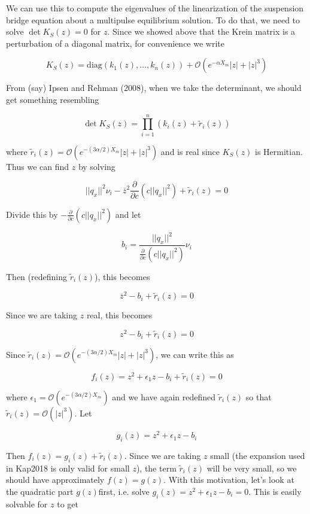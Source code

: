 \documentclass[12pt]{article}
\begin{document}
We can use this to compute the eigenvalues of the linearization of the suspension bridge equation about a multipulse equilibrium solution. To do that, we need to solve $\det K_S(z) = 0$ for $z$. Since we showed above that the Krein matrix is a perturbation of a diagonal matrix, for convenience we write

\[
K_S(z) = \text{diag}(k_1(z), \dots, k_n(z)) + \mathcal{O}(e^{-\alpha X_m}|z| + |z|^3)
\]

From (say) Ipsen and Rehman (2008), when we take the determinant, we should get something resembling

\[
\det K_S(z) = \prod_{i = 1}^n (k_i(z) + \tilde{r}_i(z))
\]

where $\tilde{r}_i(z) = \mathcal{O}(e^{-(3 \alpha/2) X_m}|z| + |z|^3)$ and is real since $K_S(z)$ is Hermitian. Thus we can find $z$ by solving

\[
||q_x||^2 \nu_i
 - \overline{z}^2 \frac{\partial}{\partial c} \left( c||q_x||^2 \right) + \tilde{r}_i(z) = 0
\]

Divide this by $-\frac{\partial}{\partial c} \left( c||q_x||^2 \right)$ and let

\[
b_i = \frac{||q_x||^2}{\frac{\partial}{\partial c} \left( c||q_x||^2 \right)} \nu_i
\]

Then (redefining $\tilde{r}_i(z)$), this becomes

\[
\overline{z}^2 - b_i + \tilde{r}_i(z) = 0
\]

Since we are taking $z$ real, this becomes

\[
z^2 - b_i + \tilde{r}_i(z) = 0
\]

Since $\tilde{r}_i(z) = \mathcal{O}(e^{-(3 \alpha/2) X_m}|z| + |z|^3)$, we can write this as

\begin{equation}\label{fz}
f_i(z) = z^2 + \epsilon_1 z - b_i + \tilde{r}_i(z) = 0
\end{equation}

where $\epsilon_1  = \mathcal{O}(e^{-(3 \alpha/2) X_m})$ and we have again redefined $\tilde{r}_i(z)$ so that $\tilde{r}_i(z) = \mathcal{O}(|z|^3)$. Let

\begin{equation}\label{gz}
g_i(z) = z^2 + \epsilon_1 z - b_i
\end{equation}

Then $f_i(z) = g_i(z) + \tilde{r}_i(z)$. Since we are taking $z$ small (the expansion used in Kap2018 is only valid for small $z$), the term $\tilde{r}_i(z)$ will be very small, so we should have approximately $f(z) = g(z)$. With this motivation, let's look at the quadratic part $g(z)$first, i.e. solve $g_i(z) = z^2 + \epsilon_1 z - b_i = 0$. This is easily solvable for $z$ to get
\end{document}
